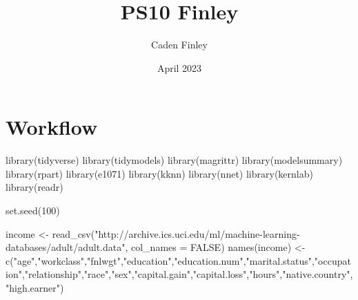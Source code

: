 \documentclass{article}
\title{PS10 Finley}
\author{Caden Finley}
\date{April 2023}
\begin{document}
\maketitle

\section{Workflow}

library(tidyverse)
library(tidymodels)
library(magrittr)
library(modelsummary)
library(rpart)
library(e1071)
library(kknn)
library(nnet)
library(kernlab)
library(readr)

set.seed(100)

income <- read_csv("http://archive.ics.uci.edu/ml/machine-learning-databases/adult/adult.data", col_names = FALSE)
names(income) <- c("age","workclass","fnlwgt","education","education.num","marital.status","occupation","relationship","race","sex","capital.gain","capital.loss","hours","native.country","high.earner")
\end{document}
